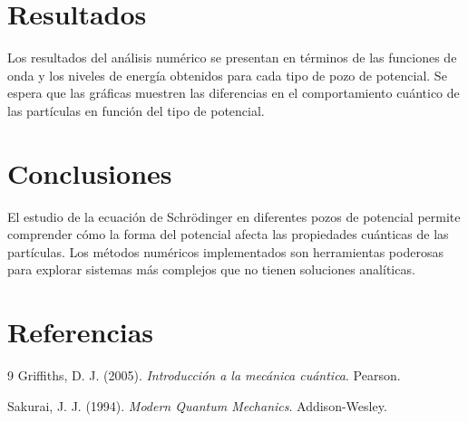 \documentclass[a4paper,12pt]{article}
\begin{document}
\section{Resultados}
Los resultados del análisis numérico se presentan en términos de las funciones de onda y los niveles de energía obtenidos para cada tipo de pozo de potencial. Se espera que las gráficas muestren las diferencias en el comportamiento cuántico de las partículas en función del tipo de potencial.

\section{Conclusiones}
El estudio de la ecuación de Schrödinger en diferentes pozos de potencial permite comprender cómo la forma del potencial afecta las propiedades cuánticas de las partículas. Los métodos numéricos implementados son herramientas poderosas para explorar sistemas más complejos que no tienen soluciones analíticas.

\section{Referencias}
\begin{thebibliography}{9}
Griffiths, D. J. (2005). \textit{Introducción a la mecánica cuántica}. Pearson.

Sakurai, J. J. (1994). \textit{Modern Quantum Mechanics}. Addison-Wesley.

\end{thebibliography}
\end{document}
